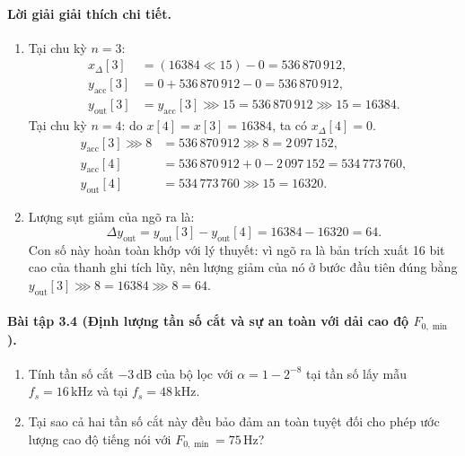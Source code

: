\paragraph{Lời giải giải thích chi tiết.}
\begin{enumerate}[label=\alph*)]
    \item Tại chu kỳ $n = 3$:
    \begin{align*}
    x_{\Delta}[3] &= (16384 \ll 15) - 0 = 536\,870\,912,\\
    y_{\mathrm{acc}}[3] &= 0 + 536\,870\,912 - 0 = 536\,870\,912,\\
    y_{\mathrm{out}}[3] &= y_{\mathrm{acc}}[3] \ggg 15 = 536\,870\,912 \ggg 15 = 16384.
    \end{align*}
    Tại chu kỳ $n = 4$: do $x[4] = x[3] = 16384$, ta có $x_{\Delta}[4] = 0$.
    \begin{align*}
    y_{\mathrm{acc}}[3] \ggg 8 &= 536\,870\,912 \ggg 8 = 2\,097\,152,\\
    y_{\mathrm{acc}}[4] &= 536\,870\,912 + 0 - 2\,097\,152 = 534\,773\,760,\\
    y_{\mathrm{out}}[4] &= 534\,773\,760 \ggg 15 = 16320.
    \end{align*}
    \item Lượng sụt giảm của ngõ ra là:
    \[
    \Delta y_{\mathrm{out}} = y_{\mathrm{out}}[3] - y_{\mathrm{out}}[4] = 16384 - 16320 = 64.
    \]
    Con số này hoàn toàn khớp với lý thuyết: vì ngõ ra là bản trích xuất 16 bit cao của thanh ghi tích lũy, nên lượng giảm của nó ở bước đầu tiên đúng bằng $y_{\mathrm{out}}[3] \ggg 8 = 16384 \ggg 8 = 64$.
\end{enumerate}

\paragraph{Bài tập 3.4 (Định lượng tần số cắt và sự an toàn với dải cao độ $F_{0,\min}$).}
\begin{enumerate}[label=\alph*)]
    \item Tính tần số cắt $-3\,\text{dB}$ của bộ lọc với $\alpha = 1 - 2^{-8}$ tại tần số lấy mẫu $f_s = 16\,\text{kHz}$ và tại $f_s = 48\,\text{kHz}$.
    \item Tại sao cả hai tần số cắt này đều bảo đảm an toàn tuyệt đối cho phép ước lượng cao độ tiếng nói với $F_{0,\min} = 75\,\text{Hz}$?
\end{enumerate}

